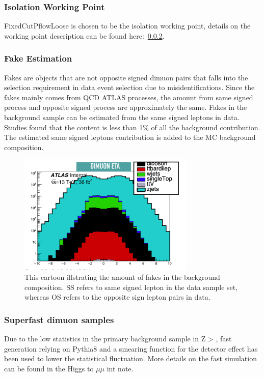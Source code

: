 \subsubsection*{Isolation Working Point}
FixedCutPflowLoose is chosen to be the isolation working point, details on the working point description can be found here:~\ref{}. 


\subsubsection{Fake Estimation}
Fakes are objects that are not opposite signed dimuon pairs that falls into the selection requirement in data event selection due to misidentifications.
Since the fakes mainly comes from QCD ATLAS processes, the amount from same signed process and opposite signed process are approximately the same. 
Fakes in the background sample can be estimated from the same signed leptons in data. Studies found that the content is less than 1\% of all the background contribution. The estimated same signed leptons contribution is added to the MC background composition.

\begin{figure}[!htb]
    \begin{center}
        \includegraphics[width=0.75\textwidth]{figures/chapter_dimuon/backgroundcomposition}
        \caption{
        This cartoon illstrating the amount of fakes in the background composition. SS refers to same signed lepton in the data sample set, whereas OS refers to the opposite sign lepton pairs in data. }
    \end{center}
\end{figure}

\subsubsection{Superfast dimuon samples}
Due to the low statistics in the primary background sample in  Z > \mu \mu, fast generation relying on Pythia8 and a smearing function for the detector effect has been used to lower the statistical fluctuation. More details on the fast simulation can be found in the Higgs to $\mu \mu $ int note.

